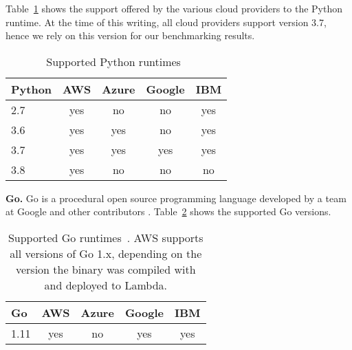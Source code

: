 Table~\ref{table:python} shows the support offered by the various cloud providers to the Python runtime. %
At the time of this writing, all cloud providers support version 3.7, hence we rely on this version for our benchmarking results.

\begin{table}[!t]
\centering
\captionsetup[table]{justification=centering, labelfont=bf}
\begin{tabular}{l|c|c|c|c} 
 Python & AWS & Azure & Google & IBM \\ \hline
2.7  & \cellcolor{green!25}yes    & \cellcolor{red!25}no    & \cellcolor{red!25}no  & \cellcolor{green!25}yes\\ \hline
3.6  & \cellcolor{green!25}yes & \cellcolor{green!25}yes & \cellcolor{red!25}no   & \cellcolor{green!25}yes \\ \hline
3.7 & \cellcolor{green!25}yes & \cellcolor{green!25}yes & \cellcolor{green!25}yes  & \cellcolor{green!25}yes \\ \hline
3.8 & \cellcolor{green!25}yes & \cellcolor{red!25}no & \cellcolor{red!25}no  & \cellcolor{red!25}no  \\ \hline
\end{tabular}
\caption[Supported Python runtimes]{Supported Python runtimes~\cite{AWSLambdaLanguages, AzureFunctionsLanguages, GoogleFunctionsLanguages, IBMRuntimes}}
\label{table:python}
\end{table}


\textbf{Go.}
Go\cite{GoProject} is a procedural open source programming language developed by a team at Google and other contributors \cite{GoDoc, GoProject}. 
Table~\ref{table:go} shows the supported Go versions.

\begin{table}[!t]
\centering
\captionsetup[table]{justification=centering, labelfont=bf}
\begin{tabular}{l|c|c|c|c} 
 Go & AWS & Azure & Google & IBM \\ \hline
1.11  & \cellcolor{green!25}yes    & \cellcolor{red!25}no    & \cellcolor{green!25}yes  & \cellcolor{green!25}yes\\ \hline
\end{tabular}
\caption[Supported Go runtimes]{Supported Go runtimes~\cite{AWSLambdaLanguages, AzureFunctionsLanguages, GoogleFunctionsLanguages, IBMRuntimes}. AWS supports all versions of Go 1.x, depending on the version the binary was compiled with and deployed to Lambda.}
\label{table:go}
\end{table}

